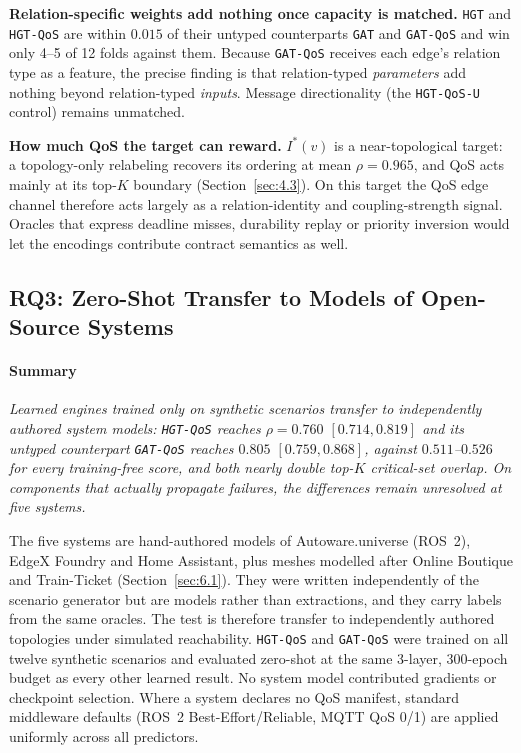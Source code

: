 \documentclass[preprint,3p]{elsarticle}
\begin{document}
\noindent\textbf{Relation-specific weights add nothing once capacity is matched.} \texttt{HGT} and \texttt{HGT-QoS} are within $0.015$ of their untyped counterparts \texttt{GAT} and \texttt{GAT-QoS} and win only 4--5 of 12 folds against them. Because \texttt{GAT-QoS} receives each edge's relation type as a feature, the precise finding is that relation-typed \emph{parameters} add nothing beyond relation-typed \emph{inputs}. Message directionality (the \texttt{HGT-QoS-U} control) remains unmatched.

\noindent\textbf{How much QoS the target can reward.} $I^*(v)$ is a near-topological target: a topology-only relabeling recovers its ordering at mean $\rho = 0.965$, and QoS acts mainly at its top-$K$ boundary (Section~\ref{sec:4.3}). On this target the QoS edge channel therefore acts largely as a relation-identity and coupling-strength signal. Oracles that express deadline misses, durability replay or priority inversion would let the encodings contribute contract semantics as well.

\subsection{RQ3: Zero-Shot Transfer to Models of Open-Source Systems}
\label{sec:rq3}

\paragraph{Summary} \emph{Learned engines trained only on synthetic scenarios transfer to independently authored system models: \texttt{HGT-QoS} reaches $\rho = 0.760$ $[0.714, 0.819]$ and its untyped counterpart \texttt{GAT-QoS} reaches $0.805$ $[0.759, 0.868]$, against $0.511$--$0.526$ for every training-free score, and both nearly double top-$K$ critical-set overlap. On components that actually propagate failures, the differences remain unresolved at five systems.}

The five systems are hand-authored models of Autoware.universe (ROS~2), EdgeX Foundry and Home Assistant, plus meshes modelled after Online Boutique and Train-Ticket (Section~\ref{sec:6.1}). They were written independently of the scenario generator but are models rather than extractions, and they carry labels from the same oracles. The test is therefore transfer to independently authored topologies under simulated reachability. \texttt{HGT-QoS} and \texttt{GAT-QoS} were trained on all twelve synthetic scenarios and evaluated zero-shot at the same 3-layer, 300-epoch budget as every other learned result. No system model contributed gradients or checkpoint selection. Where a system declares no QoS manifest, standard middleware defaults (ROS~2 Best-Effort/Reliable, MQTT QoS 0/1) are applied uniformly across all predictors.
\end{document}
